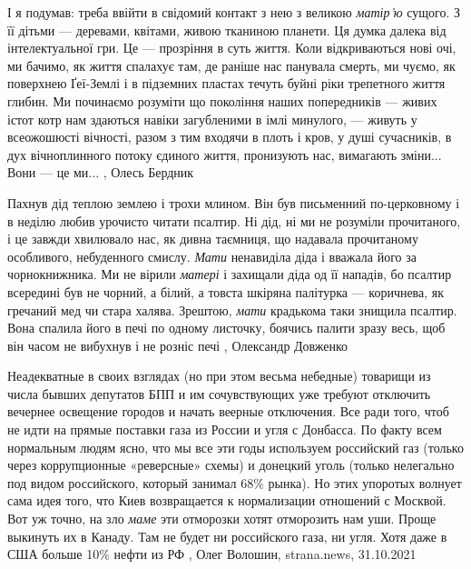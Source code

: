 І я подумав: треба ввійти в свідомий контакт з нею з великою \emph{матір’ю} сущого. З
її дітьми — деревами, квітами, живою тканиною планети. Ця думка далека від
інтелектуальної гри. Це — прозріння в суть життя. Коли відкриваються нові очі,
ми бачимо, як життя спалахує там, де раніше нас панувала смерть, ми чуємо, як
поверхнею Ґеї-Землі і в підземних пластах течуть буйні ріки трепетного життя
глибин. Ми починаємо розуміти що покоління наших попередників — живих істот
котр нам здаються навіки загубленими в імлі минулого, — живуть у всеожошюсті
вічності, разом з тим входячи в плоть і кров, у душі сучасників, в дух
вічноплинного потоку єдиного життя, пронизують нас, вимагають зміни... Вони — це
ми...
, Олесь Бердник

Пахнув дід теплою землею і трохи млином. Він був письменний по-церковному і в
неділю любив урочисто читати псалтир. Ні дід, ні ми не розуміли прочитаного, і
це завжди хвилювало нас, як дивна таємниця, що надавала прочитаному особливого,
небуденного смислу.  \emph{Мати} ненавиділа діда і вважала його за
чорнокнижника. Ми не вірили \emph{матері} і захищали діда од її нападів, бо
псалтир всередині був не чорний, а білий, а товста шкіряна палітурка —
коричнева, як гречаний мед чи стара халява. Зрештою, \emph{мати} крадькома таки
знищила псалтир. Вона спалила його в печі по одному листочку, боячись палити
зразу весь, щоб він часом не вибухнув і не розніс печі
, Олександр Довженко

Неадекватные в своих взглядах (но при этом весьма небедные) товарищи из числа
бывших депутатов БПП и им сочувствующих уже требуют отключить вечернее
освещение городов и начать веерные отключения. Все ради того, чтоб не идти на
прямые поставки газа из России и угля с Донбасса. По факту всем нормальным
людям ясно, что мы все эти годы используем российский газ (только через
коррупционные «реверсные» схемы) и донецкий уголь (только нелегально под видом
российского, который занимал 68\% рынка). Но этих упоротых волнует сама идея
того, что Киев возвращается к нормализации отношений с Москвой.  Вот уж точно,
на зло \emph{маме} эти отморозки хотят отморозить нам уши. Проще выкинуть их в
Канаду. Там не будет ни российского газа, ни угля. Хотя даже в США больше 10\%
нефти из РФ
, 
Олег Волошин, strana.news, 31.10.2021
